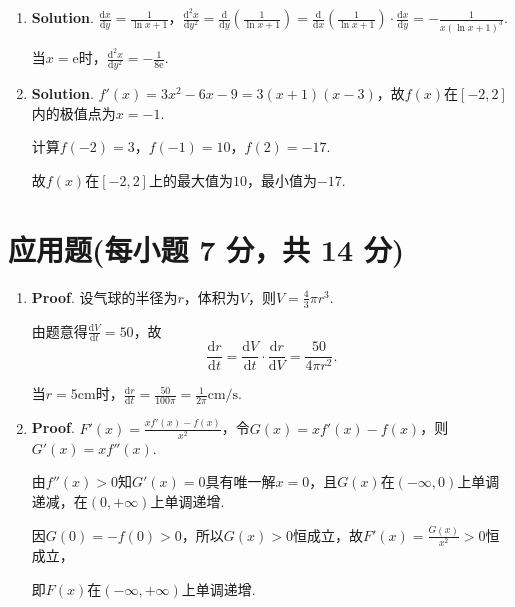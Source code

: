 \documentclass[../Main.tex]{subfiles}
\begin{document}
\begin{enumerate}
    \item[15.] \textbf{Solution}. $\frac{\mathrm{d}x}{\mathrm{d}y}=\frac{1}{\ln
      x+1}$，$\frac{\mathrm{d}^{2} x}{\mathrm{d}y^{2}}=\frac{\mathrm{d}}{\mathrm{d}y}
      \left(\frac{1}{\ln x+1}\right)=\frac{\mathrm{d}}{\mathrm{d}x}\left(\frac{1}{\ln
      x+1}\right)\cdot\frac{\mathrm{d}x}{\mathrm{d}y}=-\frac{1}{x(\ln x+1)^{3}}$.

      当$x=\mathrm{e}$时，$\frac{\mathrm{d}^{2} x}{\mathrm{d}y^{2}}=-\frac{1}{8\mathrm{e}}$.

    \item[16.] \textbf{Solution}. $f'(x)=3x^{2}-6x-9=3(x+1)(x-3)$，故$f(x)$在$[-2
      ,2]$内的极值点为$x=-1$.

      计算$f(-2)=3$，$f(-1)=10$，$f(2)=-17$.

      故$f(x)$在$[-2,2]$上的最大值为$10$，最小值为$-17$.
  \end{enumerate}

  \section{应用题(每小题 7 分，共 14 分)}
  \begin{enumerate}
    \item[17.] \textbf{Proof}. 设气球的半径为$r$，体积为$V$，则$V=\frac{4}{3}\pi r
      ^{3}$.

      由题意得$\frac{\mathrm{d}V}{\mathrm{d}t}=50$，故
      \[
        \frac{\mathrm{d}r}{\mathrm{d}t}=\frac{\mathrm{d}V}{\mathrm{d}t}\cdot\frac{\mathrm{d}r}{\mathrm{d}V}
        =\frac{50}{4\pi r^{2}}.
      \]

      当$r=5\mathrm{cm}$时，$\frac{\mathrm{d}r}{\mathrm{d}t}=\frac{50}{100\pi}=\frac{1}{2\pi}
      \mathrm{cm/s}$.

    \item[18.] \textbf{Proof}. $F'(x)=\frac{xf'(x)-f(x)}{x^{2}}$，令$G(x)=xf'(x)-
      f(x)$，则$G'(x)=xf''(x)$.

      由$f''(x)>0$知$G'(x)=0$具有唯一解$x=0$，且$G(x)$在$(-\infty,0)$上单调递减，在$(
      0,+\infty)$上单调递增.

      因$G(0)=-f(0)>0$，所以$G(x)>0$恒成立，故$F'(x)=\frac{G(x)}{x^{2}}>0$恒成立，

      即$F(x)$在$\left(-\infty,+\infty\right)$上单调递增.
  \end{enumerate}
\end{document}
